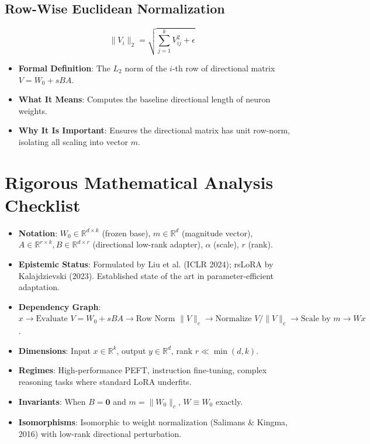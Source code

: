 \documentclass[11pt,a4paper]{article}
\theoremstyle{definition}
\begin{document}
\subsection{Row-Wise Euclidean Normalization}
{\boldmath
\begin{equation}
\|V_i\|_2 = \sqrt{\sum_{j=1}^k V_{ij}^2 + \epsilon}
\end{equation}
}
\begin{itemize}
    \item \textbf{Formal Definition}: The $L_2$ norm of the $i$-th row of directional matrix $V = W_0 + s BA$.
    \item \textbf{What It Means}: Computes the baseline directional length of neuron weights.
    \item \textbf{Why It Is Important}: Ensures the directional matrix has unit row-norm, isolating all scaling into vector $m$.
\end{itemize}

\section{Rigorous Mathematical Analysis Checklist}

\begin{itemize}
    \item \textbf{Notation}: $W_0 \in \mathbb{R}^{d \times k}$ (frozen base), $m \in \mathbb{R}^d$ (magnitude vector), $A \in \mathbb{R}^{r \times k}, B \in \mathbb{R}^{d \times r}$ (directional low-rank adapter), $\alpha$ (scale), $r$ (rank).
    \item \textbf{Epistemic Status}: Formulated by Liu et al. (ICLR 2024); rsLoRA by Kalajdzievski (2023). Established state of the art in parameter-efficient adaptation.
    \item \textbf{Dependency Graph}: $x \to \text{Evaluate } V = W_0 + sBA \to \text{Row Norm } \|V\|_c \to \text{Normalize } V / \|V\|_c \to \text{Scale by } m \to W x$.
    \item \textbf{Dimensions}: Input $x \in \mathbb{R}^k$, output $y \in \mathbb{R}^d$, rank $r \ll \min(d, k)$.
    \item \textbf{Regimes}: High-performance PEFT, instruction fine-tuning, complex reasoning tasks where standard LoRA underfits.
    \item \textbf{Invariants}: When $B = \mathbf{0}$ and $m = \|W_0\|_c$, $W \equiv W_0$ exactly.
    \item \textbf{Isomorphisms}: Isomorphic to weight normalization (Salimans \& Kingma, 2016) with low-rank directional perturbation.
\end{itemize}
\end{document}
